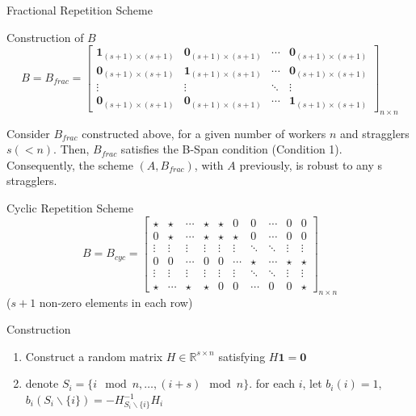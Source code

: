 \documentclass{beamer}
\begin{document}
\begin{frame}{Fractional Repetition Scheme}
    \begin{block}{Construction of $B$}
        \[B = B_{frac} = \begin{bmatrix}
            \boldsymbol{1}_{(s+1)\times (s+1)} & \boldsymbol{0}_{(s+1)\times (s+1)} & \cdots & \boldsymbol{0}_{(s+1)\times (s+1)} \\
            \boldsymbol{0}_{(s+1)\times (s+1)} & \boldsymbol{1}_{(s+1)\times (s+1)} & \cdots & \boldsymbol{0}_{(s+1)\times (s+1)} \\
            \vdots & \vdots & \ddots & \vdots \\
            \boldsymbol{0}_{(s+1)\times (s+1)} & \boldsymbol{0}_{(s+1)\times (s+1)} & \cdots & \boldsymbol{1}_{(s+1)\times (s+1)}
        \end{bmatrix}_{n\times n}\]
    \end{block}

    \begin{theorem}
        Consider $B_{frac}$ constructed above, for a given number of workers $n$ and stragglers $s (< n)$. Then, $B_{frac}$ satisfies the B-Span condition (Condition 1). Consequently, the scheme $(A, B_{frac})$, with $A$ previously, is robust to any s stragglers.
    \end{theorem}
\end{frame}

\begin{frame}{Cyclic Repetition Scheme}
    \[B = B_{cyc} = \begin{bmatrix}
        \star & \star & \cdots & \star & \star & 0 & 0 & \cdots & 0 & 0 \\
        0 & \star & \cdots & \star & \star & \star & 0 & \cdots & 0 & 0 \\
        \vdots & \vdots & \vdots & \vdots & \vdots & \vdots & \ddots & \ddots & \vdots & \vdots \\
        0 & 0 & \cdots & 0 & 0 & \cdots & \star & \cdots & \star & \star \\
        \vdots & \vdots & \vdots & \vdots & \vdots & \vdots & \ddots & \ddots & \vdots & \vdots \\
        \star & \cdots & \star & \star & 0 & 0 & \cdots & 0 & 0 & \star
    \end{bmatrix}_{n\times n}\]
    ($s + 1$ non-zero elements in each row)

    \begin{block}{Construction}
        \begin{enumerate}
            \item Construct a random matrix $H \in \mathbb{R}^{s\times n}$ satisfying $H\boldsymbol{1} = \boldsymbol{0}$
            \item denote $S_i = \{i \mod n, \dots, (i + s) \mod n\}.$ for each $i$, let $b_i(i) = 1$, $b_i(S_i \backslash \{i\}) = -H_{S_i \backslash \{i\}}^{-1}H_i$
        \end{enumerate}
    \end{block}
\end{frame}
\end{document}
